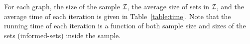


For each graph, the size of the sample $\mathcal{I}$, the average size of sets in
$\mathcal{I}$, and the average time of each iteration is given in
Table~\ref{table:time}. Note that the running time of each iteration is a
function of both sample size and sizes of the sets (informed-sets) inside the
sample.


